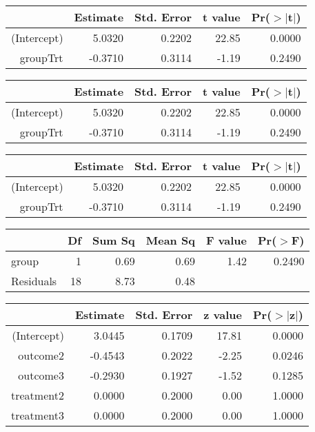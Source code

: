 \documentclass[10pt, fullpage, a4paper, titlepage]{article}
\begin{document}
\begin{table}[ht]
\begin{tabular}{rrrrr}
  \hline
 & Estimate & Std. Error & t value & Pr($>$$|$t$|$) \\ 
  \hline
(Intercept) & 5.0320 & 0.2202 & 22.85 & 0.0000 \\ 
  groupTrt & -0.3710 & 0.3114 & -1.19 & 0.2490 \\ 
   \hline
\end{tabular}
\end{table}
\begin{table}[ht]
\begin{tabular}{rrrrr}
  \hline
 & Estimate & Std. Error & t value & Pr($>$$|$t$|$) \\ 
  \hline
(Intercept) & 5.0320 & 0.2202 & 22.85 & 0.0000 \\ 
  groupTrt & -0.3710 & 0.3114 & -1.19 & 0.2490 \\ 
   \hline
\end{tabular}
\end{table}
\begin{table}[ht]
\centering
\begin{tabular}{rrrrr}
  \hline
 & Estimate & Std. Error & t value & Pr($>$$|$t$|$) \\ 
  \hline
(Intercept) & 5.0320 & 0.2202 & 22.85 & 0.0000 \\ 
  groupTrt & -0.3710 & 0.3114 & -1.19 & 0.2490 \\ 
   \hline
\end{tabular}
\end{table}
\begin{table}[ht]
\centering
\begin{tabular}{lrrrrr}
  \hline
 & Df & Sum Sq & Mean Sq & F value & Pr($>$F) \\ 
  \hline
group & 1 & 0.69 & 0.69 & 1.42 & 0.2490 \\ 
  Residuals & 18 & 8.73 & 0.48 &  &  \\ 
   \hline
\end{tabular}
\end{table}
\begin{table}[ht]
\centering
\begin{tabular}{rrrrr}
  \hline
 & Estimate & Std. Error & z value & Pr($>$$|$z$|$) \\ 
  \hline
(Intercept) & 3.0445 & 0.1709 & 17.81 & 0.0000 \\ 
  outcome2 & -0.4543 & 0.2022 & -2.25 & 0.0246 \\ 
  outcome3 & -0.2930 & 0.1927 & -1.52 & 0.1285 \\ 
  treatment2 & 0.0000 & 0.2000 & 0.00 & 1.0000 \\ 
  treatment3 & 0.0000 & 0.2000 & 0.00 & 1.0000 \\ 
   \hline
\end{tabular}
\end{table}
\end{document}
